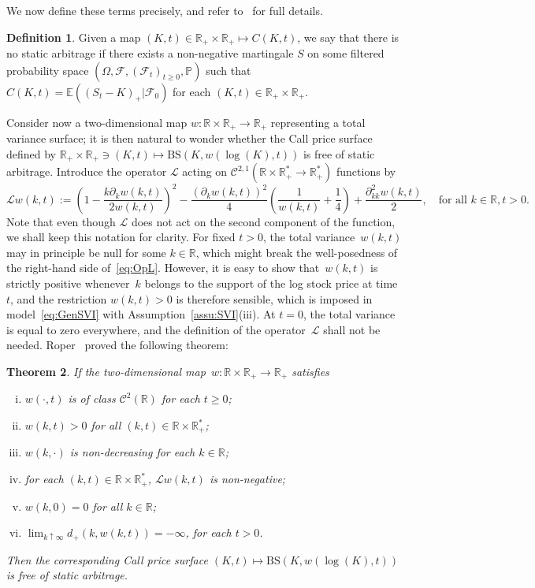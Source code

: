 \documentclass{amsart}[11pt]
\numberwithin{equation}{section}
\newtheorem{theorem}{Theorem}[section]
\theoremstyle{definition}
\newtheorem{definition}[theorem]{Definition}
\newcommand{\RR}{\mathbb{R}}
\newcommand{\Ll}{\mathcal{L}}
\newcommand{\Cc}{\mathcal{C}}
\newcommand{\BS}{\mathrm{BS}}
\newcommand{\Ff}{\mathcal{F}}
\newcommand{\EE}{\mathbb{E}}
\begin{document}
We now define these terms precisely, and refer to~\cite{roper} for full details.
\begin{definition}\label{def:NoArb}
Given a map $(K,t)\in \RR_+ \times \RR_+\mapsto C(K,t)$, we say that there is no static arbitrage if there exists a non-negative martingale $S$ on some filtered probability space $(\Omega, \Ff ,(\Ff_t)_{t\geq 0}, \mathbb{P})$ such that
$C(K, t) = \EE((S_t-K)_+\vert \Ff_0)$ for each $(K,t) \in \RR_+\times \RR_+$.
\end{definition}
Consider now a two-dimensional map $w:\RR\times \RR_+\to \RR_+$ representing a total variance surface;
it is then natural to wonder whether the Call price surface defined by 
$\RR_+ \times \RR_+ \ni (K,t) \mapsto \BS(K, w(\log(K),t))$ is free of static arbitrage.
Introduce the operator $\Ll$ acting on $\Cc^{2,1}(\RR\times \RR_+^*\to \RR_+^*)$ functions by
\begin{equation}\label{eq:OpL}
\Ll w (k,t):=\left(1-\frac{k\partial_kw(k,t)}{2w(k,t)}\right)^2-\frac{(\partial_kw(k,t))^2}{4}\left(\frac{1}{w(k,t)}+\frac{1}{4}\right)+\frac{\partial_{kk}^2w(k,t)}{2},
\quad\text{for all }k\in\RR, t>0.
\end{equation}
Note that even though $\Ll$ does not act on the second component of the function, 
we shall keep this notation for clarity.
For fixed $t>0$, the total variance~$w(k,t)$ may in principle be null for some $k\in \RR$,
which might break the well-posedness of the right-hand side of~\eqref{eq:OpL}.
However, it is easy to show that~$w(k, t)$ is strictly positive whenever~$k$ 
belongs to the support of the log stock price at time~$t$,
and the restriction $w(k,t)>0$ is therefore sensible, which is imposed in model~\eqref{eq:GenSVI} 
with Assumption~\ref{assu:SVI}(iii).
At $t=0$, the total variance is equal to zero everywhere, and the definition of the operator~$\Ll$
shall not be needed.
Roper~\cite[Theorem 2.9]{roper} proved the following theorem:
\begin{theorem}\label{thm:RoperNoArb}
If the two-dimensional map~$w:\RR\times \RR_+\to\RR_+$ satisfies
\begin{enumerate}[(i)]
\item $w(\cdot,t)$ is of class $\Cc^2(\RR)$ for each $t\geq 0$;
\item $w(k,t)>0$ for all $(k,t)\in \RR\times \RR^*_+$;
\item $w(k,\cdot)$ is non-decreasing for each $k\in\RR$;
\item for each $(k,t)\in \RR\times \RR^*_+$, $\Ll w (k,t)$ is non-negative;
\item $w(k, 0)=0$ for all $k\in\RR$;
\item $\lim_{k\uparrow \infty}d_+(k,w(k,t)) = -\infty$, for each $t>0$.
\end{enumerate}
Then the corresponding Call price surface $(K,t)\mapsto \BS(K,w(\log(K),t))$ is free of static arbitrage.
\end{theorem}
\end{document}
